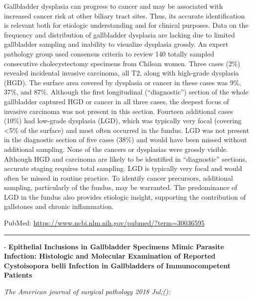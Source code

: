 \documentclass[]{article}
\begin{document}
Gallbladder dysplasia can progress to cancer and may be associated with
increased cancer risk at other biliary tract sites. Thus, its accurate
identification is relevant both for etiologic understanding and for
clinical purposes. Data on the frequency and distribution of gallbladder
dysplasia are lacking due to limited gallbladder sampling and inability
to visualize dysplasia grossly. An expert pathology group used consensus
criteria to review 140 totally sampled consecutive cholecystectomy
specimens from Chilean women. Three cases (2\%) revealed incidental
invasive carcinoma, all T2, along with high-grade dysplasia (HGD). The
surface area covered by dysplasia or cancer in these cases was 9\%,
37\%, and 87\%. Although the first longitudinal (``diagnostic'') section
of the whole gallbladder captured HGD or cancer in all three cases, the
deepest focus of invasive carcinoma was not present in this section.
Fourteen additional cases (10\%) had low-grade dysplasia (LGD), which
was typically very focal (covering \textless{}5\% of the surface) and
most often occurred in the fundus. LGD was not present in the diagnostic
section of five cases (38\%) and would have been missed without
additional sampling. None of the cancers or dysplasias were grossly
visible. Although HGD and carcinoma are likely to be identified in
``diagnostic'' sections, accurate staging requires total sampling. LGD
is typically very focal and would often be missed in routine practice.
To identify cancer precursors, additional sampling, particularly of the
fundus, may be warranted. The predominance of LGD in the fundus also
provides etiologic insight, supporting the contribution of gallstones
and chronic inflammation.

PubMed: \url{https://www.ncbi.nlm.nih.gov/pubmed/?term=30036595}

{}

{}

\begin{center}\rule{0.5\linewidth}{\linethickness}\end{center}

 - \textbf{Epithelial Inclusions in Gallbladder Specimens Mimic Parasite
Infection: Histologic and Molecular Examination of Reported Cystoisopora
belli Infection in Gallbladders of Immunocompetent Patients}

\emph{The American journal of surgical pathology 2018 Jul;():}
\end{document}
